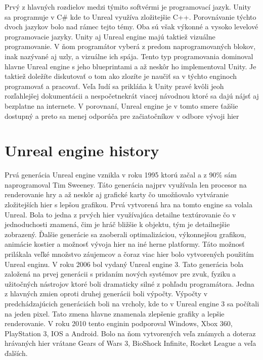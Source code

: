 \documentclass[10pt,twoside,slovak,a4paper]{article}
\begin{document}
Prvý z hlavných rozdielov medzi týmito softvérmi je programovací jazyk. Unity sa programuje v C\# kde to Unreal využíva zložitejšie C++. Porovnávanie týchto dvoch jazykov bolo nad rámec tejto témy. Oba sú však výkonné a vysoko levelové programovacie jazyky. Unity aj Unreal engine majú taktiež vizuálne programovanie. V ňom programátor vyberá z predom naprogramovaných blokov, inak nazývané aj uzly, a vizuálne ich spája. Tento typ programovania dominoval hlavne Unreal engine s jeho blueprintami a až neskôr ho implementoval Unity. Je taktiež doležíte diskutovať o tom ako zlozíte je naučiť sa v týchto enginoch programovať a pracovať. Veľa ľudí sa prikláňa k Unity pravé kvôli jeoh rozľahlejšej dokumentácii a nespočetnekrát viacej návodnou ktoré sa dajú nájsť aj bezplatne na internete. V porovnaní, Unreal engine je v tomto smere ťažšie dostupný a preto sa menej odporúča pre začiatočníkov v odbore vývoji hier

\section{Unreal engine history} 

Prvá generácia Unreal engine vznikla v roku 1995 ktorú začal a z 90\% sám naprogramoval Tim Sweeney. Táto generácia najprv využívala len procesor na renderovanie hry a až neskôr aj grafické karty čo umožňovalo vytváranie zložitejších hier s lepšou grafikou. Prvá vytvorená hra na tomto engine sa volala Unreal. Bola to jedna z prvých hier využívajúca detailne textúrovanie čo v jednoduchosti znamená, čim je hráč bližšie k objektu, tým je detailnejšie zobrazený. Ďalšie generácie sa zaoberali optimalizáciou, výkonnejšou grafikou, animácie kostier a možnosť vývoja hier na iné herne platformy. Táto možnosť prilákala veľké množstvo záujemcov a čoraz viac hier bolo vytvorených použitím Unreal enginu. V roku 2006 bol vydaný Unreal engine 3. Tato generácia bola založená na prvej generácii s pridaním nových systémov pre zvuk, fyziku a užitočných nástrojov ktoré boli dramaticky silné z pohľadu programátora. Jedna z hlavných zmien oproti druhej generácii boli výpočty. Výpočty v predchádzajúcich generáciách boli na vrcholy, kde to v Unreal engine 3 sa počítali na jeden pixel. Tato zmena hlavne znamenala zlepšenie grafiky a lepšie renderovanie. V roku 2010 tento enginin podporoval Windows, Xbox 360, PlayStation 3, IOS a Android. Bolo na ňom vytvorených veľa známych a doteraz hrávaných hier vrátane Gears of Wars 3, BioShock Infinite, Rocket League a veľa ďalších.
\cite{Historia}




\end{document}
